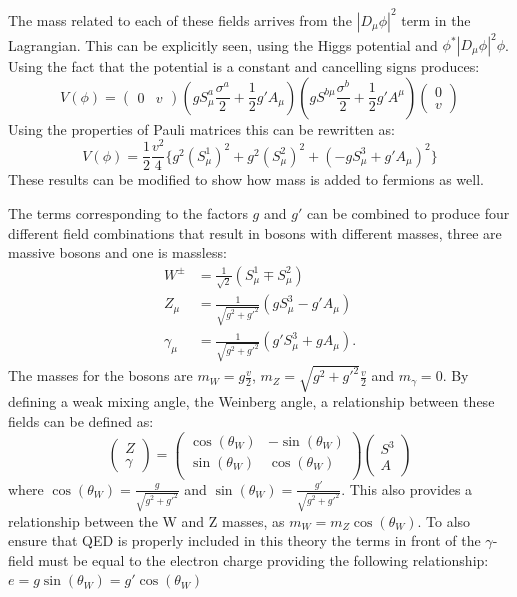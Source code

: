 The mass related to each of these fields arrives from the $|D_\mu \phi |^2$ term in the Lagrangian. This can be explicitly seen, using the Higgs potential and $\phi^* |D_\mu \phi |^2 \phi$. Using the fact that the potential is a constant and cancelling signs produces:
\begin{equation}
V(\phi) = \begin{pmatrix}
    0 & v
\end{pmatrix}
(
g S^a_\mu \frac{\sigma^a}{2} + \frac{1}{2}g' A_\mu
)
(
g S^{b\mu} \frac{\sigma^b}{2} + \frac{1}{2}g' A^\mu
)
\begin{pmatrix}
    0\\
    v
\end{pmatrix}
\end{equation}
Using the properties of Pauli matrices this can be rewritten as:
\begin{equation}
V(\phi) = \frac{1}{2}\frac{v^2}{4}\lbrace g^2 (S_\mu^1)^2 + g^2 (S_\mu^2)^2 + (-gS^3_\mu+g' A_\mu)^2 \rbrace
\end{equation}
These results can be modified to show how mass is added to fermions as well.

The terms corresponding to the factors $g$ and $g'$ can be combined to produce four different field combinations that result in bosons with different masses, three are massive bosons and one is massless:
\begin{align}
W^\pm &= \frac{1}{\sqrt{2}}(S_\mu^1 \mp S_\mu^2)\\
Z_\mu &= \frac{1}{\sqrt{g^2+g'^2}}(gS_\mu^3 - g' A_\mu)\\
\gamma_\mu &= \frac{1}{\sqrt{g^2+g'^2}}(g'S_\mu^3 + g A_\mu).
\end{align}
The masses for the bosons are  $m_W = g\frac{v}{2}$, $m_Z = \sqrt{g^2+g'^2}\frac{v}{2}$ and $m_\gamma = 0$. By defining a weak mixing angle, the Weinberg angle, a relationship between these fields can be defined as:
\begin{equation}
\begin{pmatrix}
    Z\\
 \gamma
\end{pmatrix}
=
\begin{pmatrix}
    \cos(\theta_W) & -\sin(\theta_W)\\
    \sin(\theta_W) & \cos(\theta_W)\\
\end{pmatrix}
\begin{pmatrix}
    S^3\\
  A
\end{pmatrix}
\end{equation}
where $\cos(\theta_W) = \frac{g}{\sqrt{g^2+g'^2}}$ and $\sin(\theta_W) = \frac{g'}{\sqrt{g^2+g'^2}}$. This also provides a relationship between the W and Z masses, as $m_W = m_Z \cos(\theta_W)$. To also ensure that QED is properly included in this theory the terms in front of the $\gamma$-field must be equal to the electron charge providing the following relationship:
$e = g \sin(\theta_W) = g' \cos(\theta_W)$

